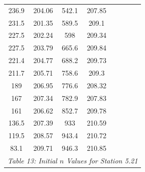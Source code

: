 \begin{center}
\begin{tabular}{|cccc||cc||cc|}
    236.9    & 204.06                   & 542.1 & 207.85                        &        &                              &          &                                     \\
    231.5    & 201.35                   & 589.5 & 209.1                         &        &                              &          &                                     \\
    227.5    & 202.24                   & 598   & 209.34                        &        &                              &          &                                     \\
    227.5    & 203.79                   & 665.6 & 209.84                        &        &                              &          &                                     \\
    221.4    & 204.77                   & 688.2 & 209.73                        &        &                              &          &                                     \\
    211.7    & 205.71                   & 758.6 & 209.3                         &        &                              &          &                                     \\
    189      & 206.95                   & 776.6 & 208.32                        &        &                              &          &                                     \\
    167      & 207.34                   & 782.9 & 207.83                        &        &                              &          &                                     \\
    161      & 206.62                   & 852.7 & 209.78                        &        &                              &          &                                     \\
    136.5    & 207.39                   & 933   & 210.59                        &        &                              &          &                                     \\
    119.5    & 208.57                   & 943.4 & 210.72                        &        &                              &          &                                     \\
    83.1     & 209.71                   & 946.3 & 210.85                        &        &                              &          &                                     \\
    \hline\multicolumn{8}{c}{\emph{Table 13: Initial $n$ Values for Station 5.21}}
\end{tabular}


\end{center}
